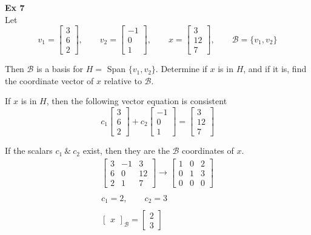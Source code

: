 \documentclass{article}
\begin{document}
   \textbf{Ex 7}\\
   Let
   \[
     v_1=\begin{bmatrix}
       3\\
       6\\
       2
     \end{bmatrix}, \qquad v_2=
     \begin{bmatrix}
       -1\\
       0\\
       1
     \end{bmatrix}, \qquad x=
     \begin{bmatrix}
       3\\
       12\\
       7
     \end{bmatrix}, \qquad \mathcal{B}=\{ v_1,v_2 \}
   \]

   Then $ \mathcal{B} $ is a basis for $ H= $ Span $ \{ v_1,v_2 \} $. Determine if $ x $ is in $ H $, and if it is, find the coordinate vector of $ x $ relative to $ \mathcal{B} $.

   If $ x $ is in $ H $, then the following vector equation is consistent
   \[
     c_1\begin{bmatrix}
       3\\
       6\\
       2
     \end{bmatrix}+
     c_2\begin{bmatrix}
       -1\\
       0\\
       1
     \end{bmatrix}=
     \begin{bmatrix}
       3\\
       12\\
       7
     \end{bmatrix}
   \]

   If the scalars $ c_1 ~\&~ c_2 $ exist, then they are the $ \mathcal{B} $  coordinates of $ x $.
   \[
     \begin{gathered}
     \begin{bmatrix}
       3 &-1 &3\\
       6 &0 &12\\
       2 &1 &7
     \end{bmatrix} \to 
     \begin{bmatrix}
       1 &0 &2\\
       0 &1 &3\\
       0 &0 &0
     \end{bmatrix}\\
     ~\\
     c_1=2, \qquad c_2=3\\
     ~\\
     \boxed{
     \begin{bmatrix}
       x
     \end{bmatrix}_\mathcal{B}=
     \begin{bmatrix}
       2\\
       3
     \end{bmatrix}}
     \end{gathered}
   \]
   
\end{document}
